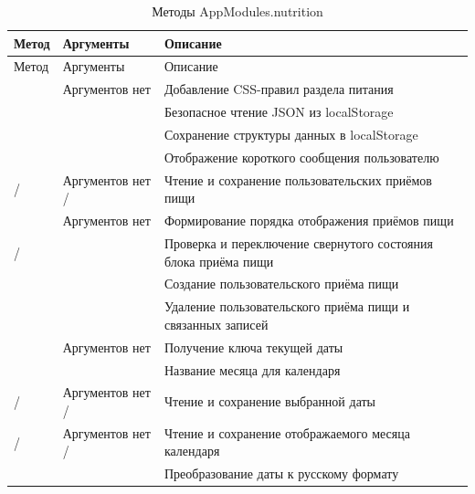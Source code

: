 \begin{xltabular}{\textwidth}{|P{4.4cm}|P{3.4cm}|X|}
	\caption{Методы AppModules.nutrition\label{tab:rp-nutrition}}\\
	\hline \centrow Метод & \centrow Аргументы & \centrow Описание \\ \hline
	\endfirsthead
	\centrow Метод & \centrow Аргументы & \centrow Описание \\ \hline
	\finishhead
	 & Аргументов нет & Добавление CSS-правил раздела питания \\ \hline
	 &  & Безопасное чтение JSON из localStorage \\ \hline
	 &  & Сохранение структуры данных в localStorage \\ \hline
	 &  & Отображение короткого сообщения пользователю \\ \hline
	 /  & Аргументов нет /  & Чтение и сохранение пользовательских приёмов пищи \\ \hline
	 & Аргументов нет & Формирование порядка отображения приёмов пищи \\ \hline
	 /  &  & Проверка и переключение свернутого состояния блока приёма пищи \\ \hline
	 &  & Создание пользовательского приёма пищи \\ \hline
	 &  & Удаление пользовательского приёма пищи и связанных записей \\ \hline
	 & Аргументов нет & Получение ключа текущей даты \\ \hline
	 &  & Название месяца для календаря \\ \hline
	 /  & Аргументов нет /  & Чтение и сохранение выбранной даты \\ \hline
	 /  & Аргументов нет /  & Чтение и сохранение отображаемого месяца календаря \\ \hline
	 &  & Преобразование даты к русскому формату \\ \hline

\end{xltabular}
